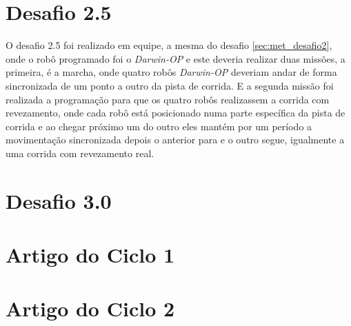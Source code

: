 \section{Desafio 2.5}
\label{sec:met_desafio2_5}
O desafio 2.5 foi realizado em equipe, a mesma do desafio \ref{sec:met_desafio2}, onde o robô programado foi o \textit{Darwin-OP} e este deveria realizar duas missões, a primeira, é a marcha, onde quatro robôs \textit{Darwin-OP} deveriam andar de forma sincronizada de um ponto a outro da pista de corrida. E a segunda missão foi realizada a programação para que os quatro robôs realizassem a corrida com revezamento, onde cada robô está posicionado numa parte específica da pista de corrida e ao chegar próximo um do outro eles mantém por um período a movimentação sincronizada depois o anterior para e o outro segue, igualmente a uma corrida com revezamento real.


\section{Desafio 3.0}
\label{sec:met_desafio3}

\section{Artigo do Ciclo 1}
\label{sec:met_artigo1}


\section{Artigo do Ciclo 2}
\label{sec:met_artigo2}

